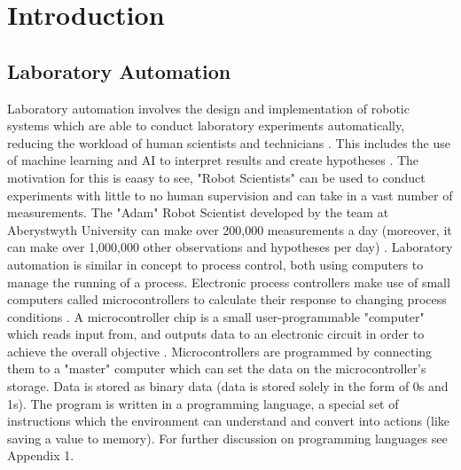 \documentclass[a4]{report}
\begin{document}
	\newpage
	\setcounter{page}{1}
	
	\chapter*{Introduction}



	\section{Laboratory Automation}
	Laboratory automation involves the design and implementation of robotic systems which are able to conduct laboratory experiments automatically, reducing the workload of human scientists and technicians \cite{backwhatisauto}. This includes the use of machine learning and AI to interpret results and create hypotheses \cite{backlitrevai, backbaconauto, backlabauto}. The motivation for this is eaasy to see, "Robot Scientists" can be used to conduct experiments with little to no human supervision and can take in a vast number of measurements. The "Adam" Robot Scientist developed by the team at Aberystwyth University can make over 200,000 measurements a day (moreover, it can make over 1,000,000 other observations and hypotheses per day)  \cite{backontorobsci}. \newline \newline \noindent
	Laboratory automation is similar in concept to process control, both using computers to manage the running of a process. Electronic process controllers make use of small computers called microcontrollers to calculate their response to changing process conditions \cite{backprocautotheory}. A microcontroller chip is a small user-programmable "computer" which reads input from, and outputs data to an electronic circuit in order to achieve the overall objective \cite{backwhatismc}. Microcontrollers are programmed by connecting them to a "master" computer which can set the data on the microcontroller's storage. Data is stored as binary data (data is stored solely in the form of 0s and 1s). The program is written in a programming language, a special set of instructions which the environment can understand and convert into actions (like saving a value to memory). For further discussion on programming languages see Appendix 1.
\end{document}
